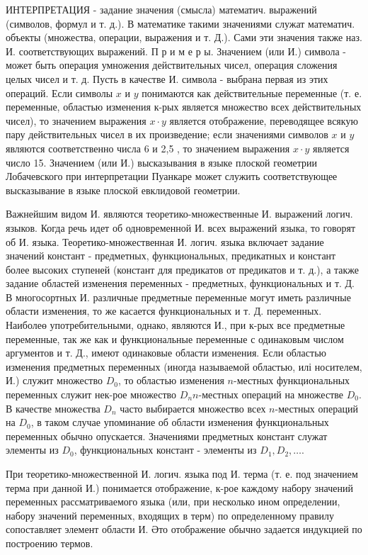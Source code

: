 \documentclass[10pt]{article}
\begin{document}
ИНТЕРПРЕТАЦИЯ - задание значения (смысла) математич. выражений (символов, формул и т. д.). В математике такими значениями служат математич. объекты (множества, операции, выражения и т. Д.). Сами эти значения также наз. И. соответствующих выражений. П р и м е р ы. Значением (или И.) символа - может быть операция умножения действительных чисел, операция сложения целых чисел и т. д. Пусть в качестве И. символа - выбрана первая из этих операций. Если символы $x$ и $y$ понимаются как действительные переменные (т. е. переменные, областью изменения к-рых является множество всех действительных чисел), то значением выражения $x \cdot y$ является отображение, переводящее всякую пару действительных чисел в их произведение; если значениями символов $x$ и $y$ являются соответственно числа 6 и 2,5 , то значением выражения $x \cdot y$ является число 15. Значением (или И.) высказывания в языке плоской геометрии Лобачевского при интерпретации Пуанкаре может служить соответствующее высказывание в языке плоской евклидовой геометрии.



Важнейшим видом И. являются теоретико-множественные И. выражений логич. языков. Когда речь идет об одновременной И. всех выражений языка, то говорят об И. языка. Теоретико-множественная И. логич. языка включает задание значений констант - предметных, функциональных, предикатных и констант более высоких ступеней (констант для предикатов от предикатов и т. д.), а также задание областей изменения переменных - предметных, функциональных и т. Д. В многосортных И. различные предметные переменные могут иметь различные области изменения, то же касается функциональных и т. Д. переменных. Наиболеө употребительными, однако, являются И., при к-рых все предметные переменные, так же как и функциональные переменные с одинаковым числом аргументов и т. Д., имеют одинаковые области изменения. Если областью изменения предметных переменных (иногда называемой областью, илі носителем, И.) служит множество $D_{0}$, то областью изменения $n$-местных функциональных переменных служит нек-рое множество $D_{n} n$-местных операций на множестве $D_{0}$. В качестве множества $D_{n}$ часто выбирается множество всех $n$-местных операций на $D_{0}$, в таком случае упоминание об области изменения функциональных переменных обычно опускается. Значениями предметных констант служат элементы из $D_{0}$, функциональных констант - элементы из $D_{1}, D_{2}, \ldots$.



При теоретико-множественной И. логич. языка под И. терма (т. е. под значением терма при данной И.) понимается отображение, к-рое каждому набору значений переменных рассматриваемого языка (или, при несколько ином определении, набору значений переменных, входящих в терм) по определенному правилу сопоставляет элемент области И. Әто отображение обычно задается индукцией по построению термов.
\end{document}
